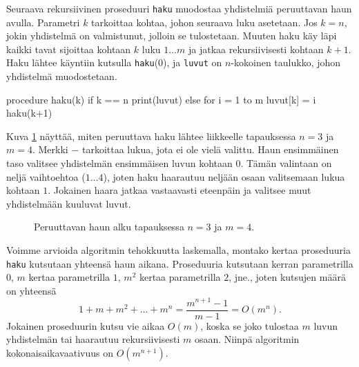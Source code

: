 Seuraava rekursiivinen proseduuri \texttt{haku} muodostaa
yhdistelmiä peruuttavan haun avulla.
Parametri $k$ tarkoittaa kohtaa, johon seuraava luku asetetaan.
Jos $k=n$, jokin yhdistelmä on valmistunut, jolloin se tulostetaan.
Muuten haku käy läpi kaikki tavat sijoittaa kohtaan $k$ luku $1 \dots m$
ja jatkaa rekursiivisesti kohtaan $k+1$.
Haku lähtee käyntiin kutsulla \texttt{haku}(0),
ja \texttt{luvut} on $n$-kokoinen taulukko, johon yhdistelmä muodostetaan.

\begin{code}
procedure haku(k)
    if k == n
        print(luvut)
    else
        for i = 1 to m
            luvut[k] = i
            haku(k+1)
\end{code}

Kuva \ref{fig:perhak} näyttää, miten peruuttava haku lähtee liikkeelle
tapauksessa $n=3$ ja $m=4$.
Merkki $-$ tarkoittaa lukua, jota ei ole vielä valittu.
Haun ensimmäinen taso valitsee yhdistelmän
ensimmäisen luvun kohtaan $0$.
Tämän valintaan on neljä vaihtoehtoa ($1 \dots 4$),
joten haku haarautuu neljään osaan valitsemaan lukua kohtaan $1$.
Jokainen haara jatkaa vastaavasti eteenpäin
ja valitsee muut yhdistelmään kuuluvat luvut.

\begin{figure}
\center
{}
\caption{Peruuttavan haun alku tapauksessa $n=3$ ja $m=4$.}
\label{fig:perhak}
\end{figure}

Voimme arvioida algoritmin tehokkuutta laskemalla,
montako kertaa proseduuria \texttt{haku} kutsutaan yhteensä haun aikana.
Proseduuria kutsutaan kerran parametrilla $0$,
$m$ kertaa parametrilla $1$, $m^2$ kertaa parametrilla $2$, jne.,
joten kutsujen määrä on yhteensä
\[
1+m+m^2+\dots+m^n = \frac{m^{n+1}-1}{m-1} = O(m^n).
\]
Jokainen proseduurin kutsu vie aikaa $O(m)$,
koska se joko tulostaa $m$ luvun yhdistelmän tai
haarautuu rekursiivisesti $m$ osaan.
Niinpä algoritmin kokonaisaikavaativuus on $O(m^{n+1})$.

